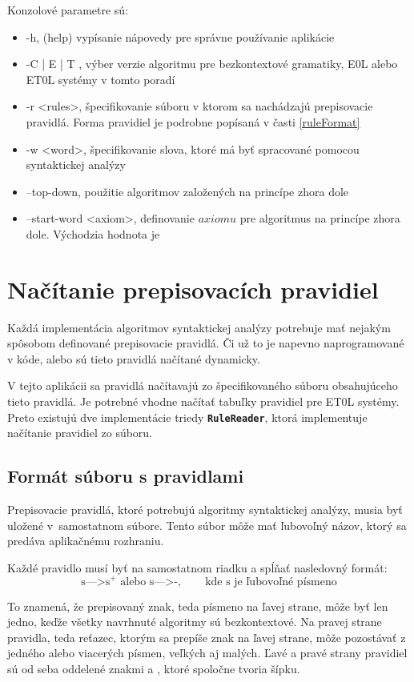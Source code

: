 Konzolové parametre sú: 

\begin{itemize}
    \item[] -h, (help) vypísanie nápovedy pre správne používanie aplikácie
    \item[] -C | E | T , výber verzie algoritmu pre bezkontextové gramatiky, E0L alebo ET0L systémy v tomto poradí
    \item[] -r <rules>, špecifikovanie súboru v ktorom sa nachádzajú prepisovacie pravidlá. Forma pravidiel je podrobne popísaná v časti \ref{ruleFormat}
    \item[] -w <word>, špecifikovanie slova, ktoré má byť spracované pomocou syntaktickej analýzy
    \item[] --top-down, použitie algoritmov založených na princípe zhora dole
    \item[] --start-word <axiom>, definovanie $axiomu$ pre algoritmus na princípe zhora dole. Východzia hodnota je 
    
\end{itemize}

\section{Načítanie prepisovacích pravidiel}
Každá implementácia algoritmov syntaktickej analýzy potrebuje mať nejakým spôsobom definované prepisovacie pravidlá. Či už to je napevno naprogramované v kóde, alebo sú tieto pravidlá načítané dynamicky.

V tejto aplikácii sa pravidlá načítavajú zo špecifikovaného súboru obsahujúceho tieto pravidlá. Je potrebné vhodne načítať tabuľky pravidiel pre ET0L systémy. Preto existujú dve implementácie triedy \textbf{\texttt{RuleReader}}, ktorá implementuje načítanie pravidiel zo súboru.

\subsection*{Formát súboru s pravidlami}
\label{ruleFormat}
Prepisovacie pravidlá, ktoré potrebujú algoritmy syntaktickej analýzy, musia byť uložené v~samostatnom súbore. Tento súbor môže mať ľubovoľný názov, ktorý sa predáva aplikačnému rozhraniu.

Každé pravidlo musí byť na samostatnom riadku a spĺňať nasledovný formát:
\[\text{s--->s${}^+$ alebo s--->-}, \quad\quad \text{kde s je ľubovoľné písmeno}\]

To znamená, že prepisovaný znak, teda písmeno na ľavej strane, môže byť len jedno, keďže všetky navrhnuté algoritmy sú bezkontextové. Na pravej strane pravidla, teda reťazec, ktorým sa prepíše znak na ľavej strane, môže pozostávať z jedného alebo viacerých písmen, veľkých aj malých. Ľavé a pravé strany pravidiel sú od seba oddelené znakmi \uv{-} a \uv{>}, ktoré spoločne tvoria šípku.

